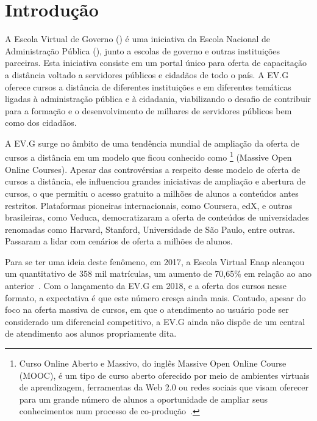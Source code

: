 \chapter{Introdução}\label{cap:01:introducao}

A Escola Virtual de Governo () é uma iniciativa da Escola Nacional de Administração Pública (), junto a escolas de governo e outras instituições parceiras.
Esta iniciativa consiste em um portal único para oferta de capacitação a distância voltado a servidores públicos e cidadãos de todo o país.
A EV.G oferece cursos a distância de diferentes instituições e em diferentes temáticas ligadas à administração pública e à cidadania, viabilizando o desafio de contribuir para a formação e o desenvolvimento de milhares de servidores públicos bem como dos cidadãos.

A EV.G surge no âmbito de uma tendência mundial de ampliação da oferta de cursos a distância em um modelo que ficou conhecido como \footnote{Curso Online Aberto e Massivo, do inglês Massive Open Online Course (MOOC), é um tipo de curso aberto oferecido por meio de ambientes virtuais de aprendizagem, ferramentas da Web 2.0 ou redes sociais que visam oferecer para um grande número de alunos a oportunidade de ampliar seus conhecimentos num processo de co-produção~\cite{Mooc}.} (Massive Open Online Courses). Apesar das controvérsias a respeito desse modelo de oferta de cursos a distância, ele influenciou grandes iniciativas de ampliação e abertura de cursos, o que permitiu o acesso gratuito a milhões de alunos a conteúdos antes restritos. Plataformas pioneiras internacionais, como Coursera, edX, e outras brasileiras, como Veduca, democratizaram a oferta de conteúdos de universidades renomadas como Harvard, Stanford, Universidade de São Paulo, entre outras. Passaram a lidar com cenários de oferta a milhões de alunos. 

Para se ter uma ideia deste fenômeno, em 2017, a Escola Virtual Enap alcançou um quantitativo de 358 mil matrículas, um aumento de 70,65\% em relação ao ano anterior~\cite{EVGnumeros}.
Com o lançamento da EV.G em 2018, e a oferta dos cursos nesse formato, a expectativa é que este número cresça ainda mais.
Contudo, apesar do foco na oferta massiva de cursos, em que o atendimento ao usuário pode ser considerado um diferencial competitivo, a EV.G ainda não dispõe de um central de atendimento aos alunos propriamente dita.

